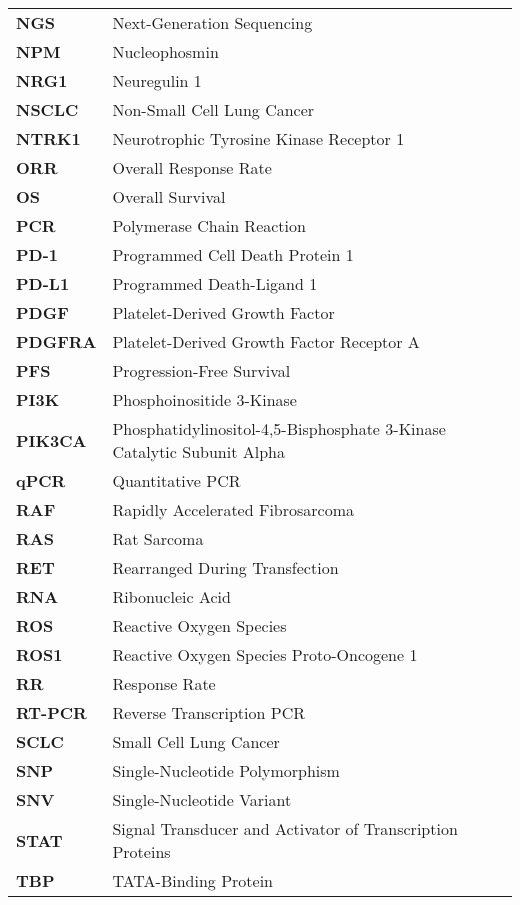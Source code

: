 \begin{longtable}[l]{l l}
    \textbf{NGS} & Next-Generation Sequencing \\
    \textbf{NPM} & Nucleophosmin \\
    \textbf{NRG1} & Neuregulin 1 \\
    \textbf{NSCLC} & Non-Small Cell Lung Cancer \\
    \textbf{NTRK1} & Neurotrophic Tyrosine Kinase Receptor 1 \\
    \textbf{ORR} &  Overall Response Rate \\
    \textbf{OS} & Overall Survival \\
    \textbf{PCR} & Polymerase Chain Reaction \\
    \textbf{PD-1} & Programmed Cell Death Protein 1 \\
    \textbf{PD-L1} & Programmed Death-Ligand 1 \\
    \textbf{PDGF} & Platelet-Derived Growth Factor \\
    \textbf{PDGFRA} & Platelet-Derived Growth Factor Receptor A \\
    \textbf{PFS} & Progression-Free Survival \\
    \textbf{PI3K} & Phosphoinositide 3-Kinase \\
    \textbf{PIK3CA} & Phosphatidylinositol-4,5-Bisphosphate 3-Kinase Catalytic Subunit Alpha \\
    \textbf{qPCR} & Quantitative PCR \\
    \textbf{RAF} & Rapidly Accelerated Fibrosarcoma \\
    \textbf{RAS} & Rat Sarcoma \\
    \textbf{RET} & Rearranged During Transfection \\
    \textbf{RNA} & Ribonucleic Acid \\
    \textbf{ROS} & Reactive Oxygen Species \\
    \textbf{ROS1} & Reactive Oxygen Species Proto-Oncogene 1 \\
    \textbf{RR} & Response Rate \\
    \textbf{RT-PCR} & Reverse Transcription PCR \\
    \textbf{SCLC} & Small Cell Lung Cancer \\
    \textbf{SNP} & Single-Nucleotide Polymorphism \\
    \textbf{SNV} & Single-Nucleotide Variant \\
    \textbf{STAT} & Signal Transducer and Activator of Transcription Proteins \\
    \textbf{TBP} & TATA-Binding Protein \\

\end{longtable}
